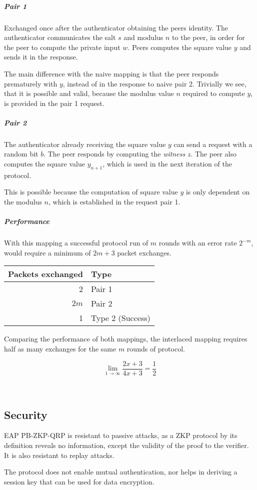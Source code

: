 \subparagraph{Pair 1} Exchanged once after the authenticator obtaining the peers identity. The authenticator communicates the salt $s$ and modulus $n$ to the peer, in order for the peer to compute the private input $w$. 
Peers computes the square value $y$ and sends it in the response.

The main difference with the naive mapping is that the peer responds prematurely with $y$, instead of in the response to naive pair 2. %
Trivially we see, that it is possible and valid, because the modulus value $n$ required to compute $y$, is provided in the pair 1 request.

\subparagraph{Pair 2}
The authenticator already receiving the square value $y$ can send a request with a random bit $b$. The peer responds by computing the \textit{witness} $z$.
The peer also computes the square value $y_{n+1}$, which is used in the next iteration of the protocol.

This is possible because the computation of square value $y$ is only dependent on the modulus $n$, which is established in the request pair 1.

\subparagraph{Performance}
With this mapping a successful protocol run of $m$ rounds with an error rate $2^{-m}$, would require a minimum of $2m + 3$ packet exchanges.

\begin{center}
\begin{tabular}{r|l}
	Packets exchanged & Type\\
	\hline
	2 & Pair 1\\
	$2m$ & Pair 2\\
	1 & Type 2 (Success)\\
\end{tabular}
\end{center}

Comparing the performance of both mappings, the interlaced mapping requires half as many exchanges for the same $m$ rounds of protocol.

$$\lim_{1 \rightarrow \infty} \frac{2x + 3}{4x + 3} = \frac{1}{2}$$

\bigskip

\

\subsection{Security}
EAP PB-ZKP-QRP is resistant to passive attacks, as a ZKP protocol by its definition reveals no information, except the validity of the proof to the verifier.
It is also resistant to replay attacks.

The protocol does not enable mutual authentication, nor helps in deriving a session key that can be used for data encryption.

